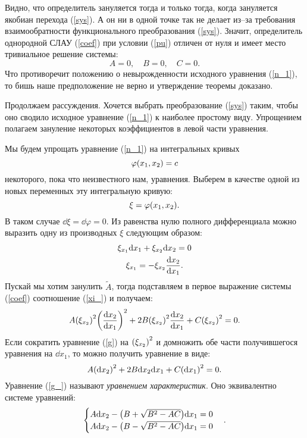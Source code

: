 \documentclass[a4paper,russian]{article}
\begin{document}
Видно, что определитель зануляется тогда и только тогда, когда зануляется якобиан перехода (\ref{sys}). А он ни в одной точке так не делает из--за требования взаимообратности функционального преобразования (\ref{sys}). Значит, определитель однородной СЛАУ (\ref{coef}) при условии (\ref{pu}) отличен от нуля и имеет место тривиальное решение системы:
\begin{equation}\label{pu_2}
A=0,\quad B=0,\quad C=0.
\end{equation}
Что противоречит положению о невырожденности исходного уравнения (\ref{n_1}), то бишь наше предположение не верно и утверждение теоремы доказано. 
\\ \par
Продолжаем рассуждения. Хочется выбрать преобразование (\ref{sys}) таким, чтобы оно сводило исходное уравнение (\ref{n_1}) к наиболее простому виду. Упрощением полагаем зануление некоторых коэффициентов в левой части уравнения.
\par
Мы будем упрощать уравнение (\ref{n_1}) на интегральных кривых  $$\varphi \qty(x_1,x_2)=c$$ некоторого, пока что неизвестного нам, уравнения. Выберем в качестве одной из новых переменных эту интегральную кривую: $$\xi = \varphi \qty(x_1,x_2).$$
В таком случае $\dd \xi = \dd \varphi = 0$. Из равенства нулю полного дифференциала можно выразить одну из производных $\xi$ следующим образом: 
\begin{gather}
	\xi_{x_1} \dd x_1 + \xi_{x_2} \dd x_2 = 0\\
	\xi_{x_1}=-\xi_{x_2} \dv{x_2}{x_1}.\label{xi_}
\end{gather}
Пускай мы хотим занулить $\tilde A$, тогда подставляем в первое выражение системы (\ref{coef}) соотношение (\ref{xi_}) и получаем:
\begin{equation}\label{g}
	A \qty(\xi_{x_2})^2\qty(\dv{x_2}{x_1})^2+ 2B\qty(\xi_{x_2})^2 \dv{x_2}{x_1}+ C \qty(\xi_{x_2})^2 = 0.
\end{equation}
Если сократить уравнение (\ref{g}) на $\qty(\xi_{x_2})^2$ и домножить обе части получившегося уравнения на $\dd x_1$, то можно получить уравнение в виде:
\begin{equation}\label{g_}
A\qty(\dd x_2)^2+2B\dd x_2 \dd x_1 + C \qty(\dd x_1)^2 = 0.
\end{equation}
Уравнение (\ref{g_}) называют \emph{уравнением характеристик}. Оно эквивалентно системе уравнений:  
\begin{equation}\label{g_sys}
\begin{cases}
	A\dd x_2 - \qty(B + \sqrt{B^2-AC})\dd x_1=0\\
	A\dd x_2 - \qty(B - \sqrt{B^2-AC})\dd x_1=0
\end{cases}.
\end{equation}
\end{document}
